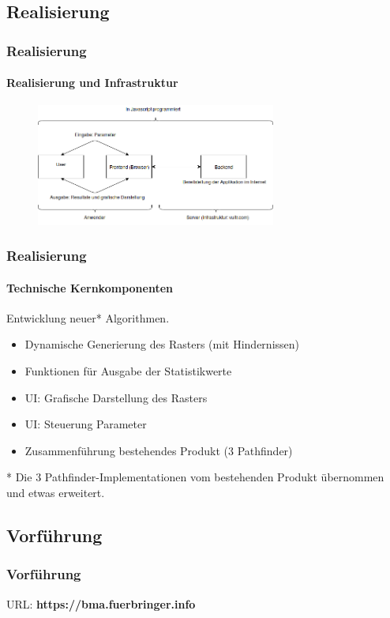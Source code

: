 \documentclass[professionalfont,serif,german]{beamer}
\begin{document}
\begin{frame}
  \section{Realisierung}
  \frametitle{Realisierung}
  \framesubtitle{Realisierung und Infrastruktur}
  \begin{figure}
    \includegraphics[height=4cm]{img/diagram1.png}
  \end{figure}
\end{frame}

\begin{frame}
  \frametitle{Realisierung}
  \framesubtitle{Technische Kernkomponenten}
  Entwicklung neuer* Algorithmen.
  \begin{itemize}
    \item Dynamische Generierung des Rasters (mit Hindernissen)
    \item Funktionen für Ausgabe der Statistikwerte
    \item UI: Grafische Darstellung des Rasters
    \item UI: Steuerung Parameter
    \item Zusammenführung bestehendes Produkt (3 Pathfinder)
  \end{itemize}
  \scriptsize{* Die 3 Pathfinder-Implementationen vom bestehenden Produkt übernommen und etwas erweitert.}
\end{frame}

\begin{frame}
  \section[Vorführung]{Vorführung}
  \frametitle{Vorführung}
  \begin{center}
    URL: \textbf{https://bma.fuerbringer.info}
  \end{center}
\end{frame}
\end{document}
